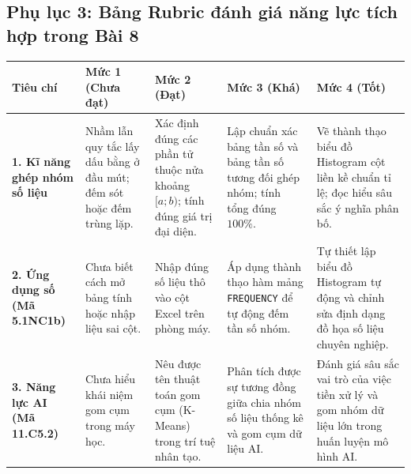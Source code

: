 \documentclass[12pt, a4paper]{article}
\begin{document}
\subsection*{Phụ lục 3: Bảng Rubric đánh giá năng lực tích hợp trong Bài 8}

\begin{center}
\begin{tabularx}{\linewidth}{|p{3.2cm}|X|X|X|X|}
\hline
\textbf{Tiêu chí} & \textbf{Mức 1 (Chưa đạt)} & \textbf{Mức 2 (Đạt)} & \textbf{Mức 3 (Khá)} & \textbf{Mức 4 (Tốt)} \\
\hline
\textbf{1. Kĩ năng ghép nhóm số liệu} & Nhầm lẫn quy tắc lấy dấu bằng ở đầu mút; đếm sót hoặc đếm trùng lặp. & Xác định đúng các phần tử thuộc nửa khoảng $[a; b)$; tính đúng giá trị đại diện. & Lập chuẩn xác bảng tần số và bảng tần số tương đối ghép nhóm; tính tổng đúng $100\%$. & Vẽ thành thạo biểu đồ Histogram cột liền kề chuẩn tỉ lệ; đọc hiểu sâu sắc ý nghĩa phân bố. \\
\hline
\textbf{2. Ứng dụng số (Mã 5.1NC1b)} & Chưa biết cách mở bảng tính hoặc nhập liệu sai cột. & Nhập đúng số liệu thô vào cột Excel trên phòng máy. & Áp dụng thành thạo hàm mảng \texttt{FREQUENCY} để tự động đếm tần số nhóm. & Tự thiết lập biểu đồ Histogram tự động và chỉnh sửa định dạng đồ họa số liệu chuyên nghiệp. \\
\hline
\textbf{3. Năng lực AI (Mã 11.C5.2)} & Chưa hiểu khái niệm gom cụm trong máy học. & Nêu được tên thuật toán gom cụm (K-Means) trong trí tuệ nhân tạo. & Phân tích được sự tương đồng giữa chia nhóm số liệu thống kê và gom cụm dữ liệu AI. & Đánh giá sâu sắc vai trò của việc tiền xử lý và gom nhóm dữ liệu lớn trong huấn luyện mô hình AI. \\
\hline
\end{tabularx}
\end{center}
\end{document}
